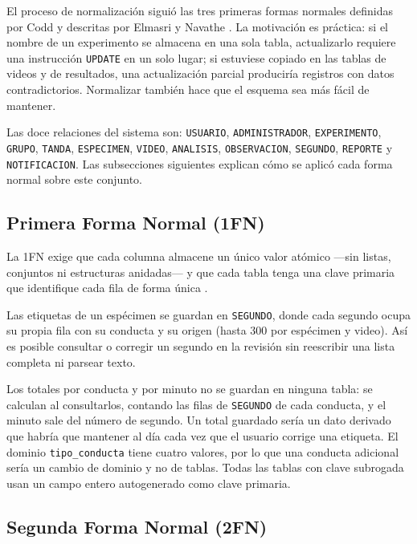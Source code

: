 El proceso de normalización siguió las tres primeras formas normales definidas
por Codd \cite{codd1970} y descritas por Elmasri y Navathe \cite{elmasri2015}.
La motivación es práctica: si el nombre de un experimento se almacena en una sola
tabla, actualizarlo requiere una instrucción \texttt{UPDATE} en un solo lugar; si
estuviese copiado en las tablas de videos y de resultados, una actualización parcial
produciría registros con datos contradictorios. Normalizar también hace que el
esquema sea más fácil de mantener.

Las doce relaciones del sistema son: \texttt{USUARIO}, \texttt{ADMINISTRADOR},
\texttt{EXPERIMENTO}, \texttt{GRUPO}, \texttt{TANDA}, \texttt{ESPECIMEN},
\texttt{VIDEO}, \texttt{ANALISIS},
\texttt{OBSERVACION}, \texttt{SEGUNDO},
\texttt{REPORTE} y \texttt{NOTIFICACION}. Las subsecciones siguientes explican
cómo se aplicó cada forma normal sobre este conjunto.

\subsection{Primera Forma Normal (1FN)}

La 1FN exige que cada columna almacene un único valor atómico ---sin listas,
conjuntos ni estructuras anidadas--- y que cada tabla tenga una clave primaria que
identifique cada fila de forma única \cite{codd1970}.

Las etiquetas de un espécimen se guardan en \texttt{SEGUNDO}, donde cada segundo
ocupa su propia fila con su conducta y su origen (hasta 300 por espécimen y video).
Así es posible consultar o corregir un segundo en la revisión sin reescribir una lista
completa ni parsear texto.

Los totales por conducta y por minuto no se guardan en ninguna tabla: se calculan al
consultarlos, contando las filas de \texttt{SEGUNDO} de cada conducta, y el minuto sale
del número de segundo. Un total guardado sería un dato derivado que habría que mantener
al día cada vez que el usuario corrige una etiqueta. El dominio \texttt{tipo\_conducta}
tiene cuatro valores, por lo que una conducta adicional sería un cambio de dominio y no
de tablas. Todas las tablas con clave subrogada usan un campo entero autogenerado como
clave primaria.

\subsection{Segunda Forma Normal (2FN)}

